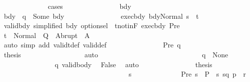 \begin{isabellebody}
\ \ \ \ \ \ \ \ \ \ \ \ \isamarkupfalse%
\ {\isacharparenleft}cases{\isacharparenright}\isanewline
\ \ \ \ \ \ \ \ \ \ \ \ \ \ \isamarkupfalse%
\ bdy\ \isanewline
\ \ \ \ \ \ \ \ \ \ \ \ \ \ \isamarkupfalse%
\ bdy{\isacharcolon}\ {\isachardoublequoteopen}{\isasymGamma}\ q\ {\isacharequal}\ Some\ bdy{\isachardoublequoteclose}\isanewline
\ \ \ \ \ \ \ \ \ \ \ \ \ \ \isamarkupfalse%
\ exec{\isacharunderscore}bdy{\isacharcolon}\ {\isachardoublequoteopen}{\isasymGamma}{\isasymturnstile}{\isasymlangle}bdy{\isacharcomma}Normal\ s{\isasymrangle}\ {\isasymRightarrow}\ t{\isachardoublequoteclose}\isanewline
\ \ \ \ \ \ \ \ \ \ \ \ \ \ \isamarkupfalse%
\ valid{\isacharunderscore}bdy\ {\isacharbrackleft}simplified\ bdy\ option{\isachardot}sel{\isacharbrackright}\ \ t{\isacharunderscore}notin{\isacharunderscore}F\ exec{\isacharunderscore}bdy\ Pre{\isacharprime}\isanewline
\ \ \ \ \ \ \ \ \ \ \ \ \ \ \isamarkupfalse%
\ {\isachardoublequoteopen}t\ {\isasymin}\ Normal\ {\isacharbackquote}\ Q{\isacharprime}\ {\isasymunion}\ Abrupt\ {\isacharbackquote}\ A{\isacharprime}{\isachardoublequoteclose}\isanewline
\ \ \ \ \ \ \ \ \ \ \ \ \ \ \ \ \isamarkupfalse%
\ {\isacharparenleft}auto\ simp\ add{\isacharcolon}\ validt{\isacharunderscore}def\ valid{\isacharunderscore}def{\isacharparenright}\isanewline
\ \ \ \ \ \ \ \ \ \ \ \ \ \ \isamarkupfalse%
\ Pre\ q\ \isanewline
\ \ \ \ \ \ \ \ \ \ \ \ \ \ \isamarkupfalse%
\ {\isacharquery}thesis\isanewline
\ \ \ \ \ \ \ \ \ \ \ \ \ \ \ \ \isamarkupfalse%
\ auto\isanewline
\ \ \ \ \ \ \ \ \ \ \ \ \isamarkupfalse%
\isanewline
\ \ \ \ \ \ \ \ \ \ \ \ \ \ \isamarkupfalse%
\ {\isachardoublequoteopen}{\isasymGamma}\ q\ {\isacharequal}\ None{\isachardoublequoteclose}\isanewline
\ \ \ \ \ \ \ \ \ \ \ \ \ \ \isamarkupfalse%
\ q\ valid{\isacharunderscore}body\ \isamarkupfalse%
\ False\ \isamarkupfalse%
\ auto\isanewline
\ \ \ \ \ \ \ \ \ \ \ \ \ \ \isamarkupfalse%
\ {\isacharquery}thesis\ \isacommand{{\isachardot}{\isachardot}}\isamarkupfalse%
\isanewline
\ \ \ \ \ \ \ \ \ \ \ \ \isamarkupfalse%
\isanewline
\ \ \ \ \ \ \ \ \ \ \isamarkupfalse%
\isanewline
\ \ \ \ \ \ \ \ \ \ \ \ \isamarkupfalse%
\ s\isanewline
\ \ \ \ \ \ \ \ \ \ \ \ \isamarkupfalse%
\ Pre{\isacharcolon}\ {\isachardoublequoteopen}s\ {\isasymin}\ P{\isacharprime}\ {\isasyminter}\ {\isacharbraceleft}s{\isachardot}\ {\isacharparenleft}{\isacharparenleft}s{\isacharcomma}q{\isacharparenright}{\isacharcomma}\ {\isasymtau}{\isacharcomma}p{\isacharparenright}\ {\isasymin}\ r{\isacharbraceright}{\isachardoublequoteclose}\isanewline

\end{isabellebody}
